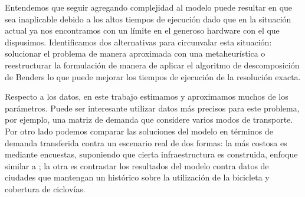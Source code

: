 Entendemos que seguir agregando complejidad al modelo puede resultar en que sea inaplicable debido a los altos tiempos de ejecución dado que en la situación actual ya nos encontramos con un límite en el generoso hardware con el que dispusimos. Identificamos dos alternativas para circunvalar esta situación: solucionar el problema de manera aproximada con una metaheurística o reestructurar la formulación de manera de aplicar el algoritmo de descomposición de Benders \parencite{bucarey2022, crainic2021} lo que puede mejorar los tiempos de ejecución de la resolución exacta.

Respecto a los datos, en este trabajo estimamos y aproximamos muchos de los parámetros. Puede ser interesante utilizar datos más precisos para este problema, por ejemplo, una matriz de demanda que considere varios modos de transporte. Por otro lado podemos comparar las soluciones del modelo en términos de demanda transferida contra un escenario real de dos formas: la más costosa es mediante encuestas, suponiendo que cierta infraestructura es construida, enfoque similar a \textcite{shwe2014}; la otra es contrastar los resultados del modelo contra datos de ciudades que mantengan un histórico sobre la utilización de la bicicleta y cobertura de ciclovías.
